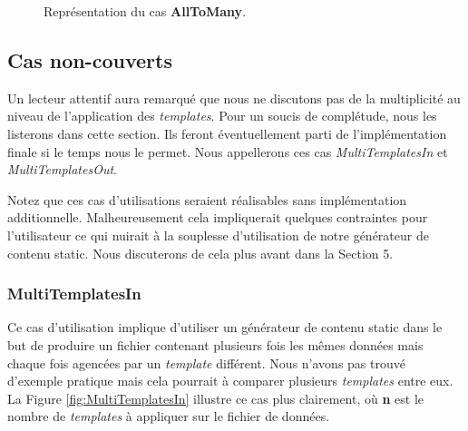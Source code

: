 			\begin{figure}
				\begin{center}
					\caption{Représentation du cas \textbf{AllToMany}.}
					\label{fig:AllToMany}
				\end{center}
			\end{figure}
		
		\subsection{Cas non-couverts}
			Un lecteur attentif aura remarqué que nous ne discutons pas de la multiplicité au niveau de l'application des \textit{templates}. Pour un soucis de complétude, nous les listerons dans cette section. Ils feront éventuellement parti de l'implémentation finale si le temps nous le permet. Nous appellerons ces cas \textit{MultiTemplatesIn} et \textit{MultiTemplatesOut}.
			
			 Notez que ces cas d'utilisations seraient réalisables sans implémentation additionnelle. Malheureusement cela impliquerait quelques contraintes pour l'utilisateur ce qui nuirait à la souplesse d'utilisation de notre générateur de contenu static. Nous discuterons de cela plus avant dans la Section 5.
			
			\subsubsection*{MultiTemplatesIn}
				Ce cas d'utilisation implique  d'utiliser un générateur de contenu static dans le but de produire un fichier contenant plusieurs fois les mêmes données mais chaque fois agencées par un \textit{template} différent. Nous n'avons pas trouvé d'exemple pratique mais cela pourrait à comparer plusieurs \textit{templates} entre eux. La Figure \ref{fig:MultiTemplatesIn} illustre ce cas plus clairement, où \textbf{n} est le nombre de \textit{templates} à appliquer sur le fichier de données.
				
